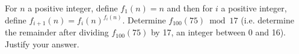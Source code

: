 For $n$ a positive integer, define $f_1 (n) = n$ and then for $i$ a positive
integer, define $f_{i+1} (n) = f_i (n)^{f_i (n)}$. Determine $f_{100} (75)
\bmod 17$ (i.e. determine the remainder after dividing $f_{100} (75)$ by 17, an
integer between 0 and 16). Justify your answer.
